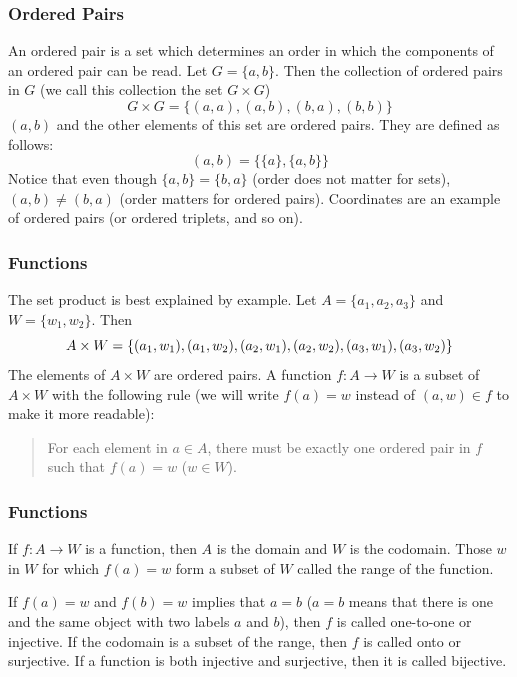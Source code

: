 \documentclass[xcolor=dvipsnames]{beamer}
\begin{document}
\begin{frame}
  \frametitle{Ordered Pairs}
  An ordered pair is a set which determines an order in which the
  components of an ordered pair can be read. Let $G=\{a,b\}$. Then
  the collection of ordered pairs in $G$ (we call this collection the
  set $G\times{}G$)
  \begin{equation}
    \label{eq:aijeenge}
   G\times{}G=\{(a,a),(a,b),(b,a),(b,b)\}
  \end{equation}
$(a,b)$ and the other elements of this set are \alert{ordered pairs}.
They are defined as follows:
\begin{equation}
  \label{eq:phohpahj}
  (a,b)=\{\{a\},\{a,b\}\}
\end{equation}
Notice that even though $\{a,b\}=\{b,a\}$ (order does not matter for
sets), $(a,b)\neq(b,a)$ (order matters for ordered pairs). Coordinates
are an example of ordered pairs (or ordered triplets, and so on).
\end{frame}

\begin{frame}
  \frametitle{Functions}
The \alert{set product} is best explained by example. Let $A=\{a_{1},a_{2},a_{3}\}$ and
$W=\{w_{1},w_{2}\}$. Then
\begin{equation}
  \label{eq:oochohdi}
  A\times{}W=\{(a_{1},w_{1}),(a_{1},w_{2}),(a_{2},w_{1}),(a_{2},w_{2}),(a_{3},w_{1}),(a_{3},w_{2})\}\notag
\end{equation}
The elements of $A\times{}W$ are ordered pairs.
A \alert{function} $f:A\rightarrow{}W$ is a subset of $A\times{}W$ with the
following rule (we will write $f(a)=w$ instead of $(a,w)\in{}f$ to
make it more readable):
\begin{quote}
For each element in $a\in{}A$, there must be exactly one ordered pair in $f$
  such that $f(a)=w$ ($w\in{}W$).
\end{quote}
\end{frame}

\begin{frame}
  \frametitle{Functions}
  If $f:A\rightarrow{}W$ is a function, then $A$ is the \alert{domain}
  and $W$ is the \alert{codomain}. Those $w$ in $W$ for which $f(a)=w$
  form a subset of $W$ called the \alert{range} of the function.

  \bigskip

  If $f(a)=w$ and $f(b)=w$ implies that $a=b$ ($a=b$ means that there
  is one and the same object with two labels $a$ and $b$), then $f$ is
  called \alert{one-to-one} or \alert{injective}. If the codomain is a
  subset of the range, then $f$ is called \alert{onto} or
  \alert{surjective}. If a function is both injective and surjective,
  then it is called \alert{bijective}.
\end{frame}
\end{document}
